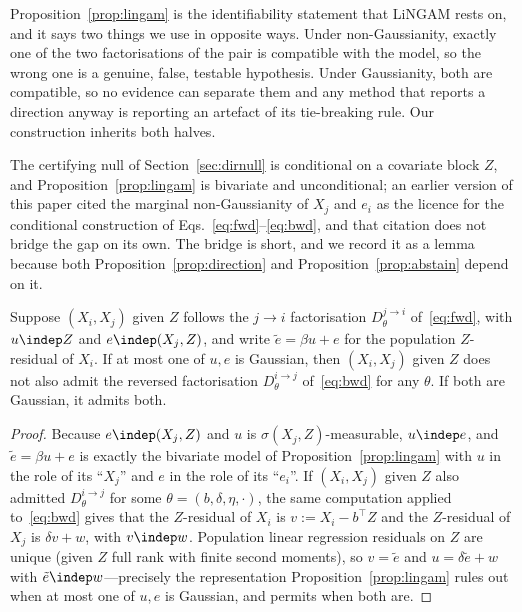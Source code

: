 Proposition~\ref{prop:lingam} is the identifiability statement that LiNGAM
rests on, and it says two things we use in opposite ways. Under
non-Gaussianity, exactly one of the two factorisations of the pair is
compatible with the model, so the wrong one is a genuine, false, testable
hypothesis. Under Gaussianity, both are compatible, so no evidence can
separate them and any method that reports a direction anyway is reporting an
artefact of its tie-breaking rule. Our construction inherits both halves.

The certifying null of Section~\ref{sec:dirnull} is conditional on a
covariate block $Z$, and Proposition~\ref{prop:lingam} is bivariate and
unconditional; an earlier version of this paper cited the marginal
non-Gaussianity of $X_j$ and $e_i$ as the licence for the conditional
construction of Eqs.~\eqref{eq:fwd}--\eqref{eq:bwd}, and that citation does not
bridge the gap on its own. The bridge is short, and we record it as a lemma
because both Proposition~\ref{prop:direction} and
Proposition~\ref{prop:abstain} depend on it.

\begin{lemma}\label{lem:cond-lingam}
Suppose $(X_i, X_j)$ given $Z$ follows the $j \to i$ factorisation
$D^{j\to i}_\theta$ of~\eqref{eq:fwd}, with $u \indep Z$ and
$e \indep (X_j, Z)$, and write $\tilde e = \beta u + e$ for the population
$Z$-residual of $X_i$. If at most one of $u, e$ is Gaussian, then
$(X_i, X_j)$ given $Z$ does not also admit the reversed factorisation
$D^{i \to j}_\theta$ of~\eqref{eq:bwd} for any $\theta$. If both are
Gaussian, it admits both.
\end{lemma}

\begin{proof}
Because $e \indep (X_j, Z)$ and $u$ is $\sigma(X_j, Z)$-measurable, $u \indep e$,
and $\tilde e = \beta u + e$ is exactly the bivariate model of
Proposition~\ref{prop:lingam} with $u$ in the role of its ``$X_j$'' and $e$ in
the role of its ``$e_i$''. If $(X_i, X_j)$ given $Z$ also admitted
$D^{i \to j}_\theta$ for some $\theta = (b, \delta, \eta, \cdot)$, the same
computation applied to~\eqref{eq:bwd} gives that the $Z$-residual of $X_i$ is
$v := X_i - b^\top Z$ and the $Z$-residual of $X_j$ is $\delta v + w$, with
$v \indep w$. Population linear regression residuals on $Z$ are unique
(given $Z$ full rank with finite second moments), so $v = \tilde e$ and
$u = \delta \tilde e + w$ with $\tilde e \indep w$---precisely the
representation Proposition~\ref{prop:lingam} rules out when at most one of
$u, e$ is Gaussian, and permits when both are.
\end{proof}

